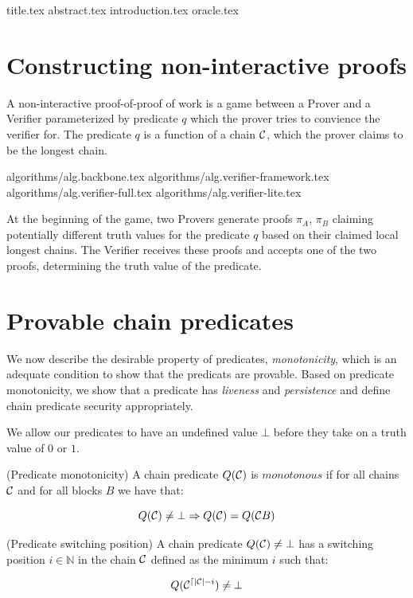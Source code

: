 \documentclass[11pt]{llncs}
\begin{document}
{title.tex}
\thispagestyle{plain}
{abstract.tex}
{introduction.tex}
{oracle.tex}

\section{Constructing non-interactive proofs}

A non-interactive proof-of-proof of work is a game between a Prover and a
Verifier parameterized by predicate $q$ which the prover tries to convience the
verifier for. The predicate $q$ is a function of a chain $\mathcal{C}$, which the
prover claims to be the longest chain.

{algorithms/alg.backbone.tex}
{algorithms/alg.verifier-framework.tex}
{algorithms/alg.verifier-full.tex}
{algorithms/alg.verifier-lite.tex}

At the beginning of the game, two Provers generate proofs $\pi_A$, $\pi_B$
claiming potentially different truth values for the predicate $q$ based on
their claimed local longest chains. The Verifier receives these proofs and
accepts one of the two proofs, determining the truth value of the predicate.

\section{Provable chain predicates}

We now describe the desirable property of predicates, \textit{monotonicity},
which is an adequate condition to show that the predicats are provable. Based
on predicate monotonicity, we show that a predicate has \textit{liveness} and
\textit{persistence} and define chain predicate security appropriately.

We allow our predicates to have an undefined value $\bot$ before they take
on a truth value of $0$ or $1$.

\begin{definition}{(Predicate monotonicity)}
    A chain predicate $Q(\mathcal{C})$ is $\textit{monotonous}$ if for all chains
    $\mathcal{C}$ and for all blocks $B$ we have that:

    \begin{equation*}
        Q(\mathcal{C}) \neq \bot \Rightarrow Q(\mathcal{C}) = Q(\mathcal{C} B)
    \end{equation*}
\end{definition}

\begin{definition}{(Predicate switching position)}
    A chain predicate $Q(\mathcal{C}) \neq \bot$ has a switching position $i \in
    \mathbb{N}$ in the chain $\mathcal{C}$ defined as the minimum $i$ such that:

    \begin{equation*}
        Q(\mathcal{C}^{\lceil |\mathcal{C}| - i}) \neq \bot
    \end{equation*}
\end{definition}
\end{document}

